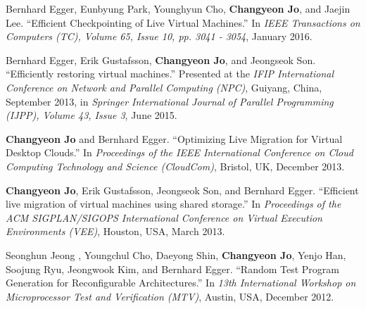 \documentclass[margin]{res}
\begin{document}
\begin{resume}
\vspace{-0.5em}
Bernhard Egger, Eunbyung Park, Younghyun Cho, \textbf{Changyeon Jo}, and Jaejin Lee. ``Efficient Checkpointing of Live Virtual Machines.'' In \textit{IEEE Transactions on Computers (TC), Volume 65, Issue 10, pp. 3041 - 3054}, January 2016.

\vspace{-0.5em}
Bernhard Egger, Erik Gustafsson, \textbf{Changyeon Jo}, and Jeongseok Son. ``Efficiently restoring virtual machines.'' Presented at the \textit{IFIP International Conference on Network and Parallel Computing (NPC)}, Guiyang, China, September 2013, in \textit{Springer International Journal of Parallel Programming (IJPP), Volume 43, Issue 3}, June 2015.

\vspace{-0.5em}
\textbf{Changyeon Jo} and Bernhard Egger. ``Optimizing Live Migration for Virtual Desktop Clouds.'' In \textit{Proceedings of the IEEE International Conference on Cloud Computing Technology and Science (CloudCom)}, Bristol, UK, December 2013.

\vspace{-0.5em}
\textbf{Changyeon Jo}, Erik Gustafsson, Jeongseok Son, and Bernhard Egger. ``Efficient live migration of virtual machines using shared storage.'' In \textit{Proceedings of the ACM SIGPLAN/SIGOPS International Conference on Virtual Execution Environments (VEE)}, Houston, USA, March 2013.

\vspace{-0.5em}
Seonghun Jeong , Youngchul Cho, Daeyong Shin, \textbf{Changyeon Jo}, Yenjo Han, Soojung Ryu, Jeongwook Kim, and Bernhard Egger. ``Random Test Program Generation for Reconfigurable Architectures.'' In \textit{13th International Workshop on Microprocessor Test and Verification (MTV)}, Austin, USA, December 2012.

\newpage




\end{resume}
\end{document}
